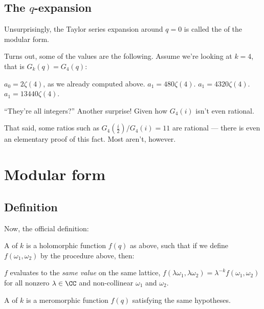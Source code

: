 \subsection{The $q$-expansion}

Unsurprisingly, the Taylor series expansion around $q=0$ is called the  of the
modular form.

Turns out, some of the values are the following. Assume we're looking at $k=4$, that is $G_k(q) =
G_4(q)$:
\begin{itemize}
	\ii $a_0 = 2 \zeta(4)$, as we already computed above.
	\ii $a_1 = 480 \zeta(4)$.
	\ii $a_1 = 4320 \zeta(4)$.
	\ii $a_1 = 13440 \zeta(4)$.
\end{itemize}

``They're all integers?'' Another surprise! Given how $G_4(i)$ isn't even rational.


\begin{remark}
	That said, some ratios such as $G_4(\frac{i}{2})/G_4(i)=11$ are rational ---
	there is even an elementary proof of this fact.
	Most aren't, however.
\end{remark}

\section{Modular form}

\subsection{Definition}

Now, the official definition:
\begin{definition}
	A  of  $k$ is a holomorphic function $f(q)$ as above,
	such that if we define $f(\omega_1, \omega_2)$ by the procedure above, then:
	\begin{itemize}
		\ii $f$ evaluates to the \emph{same value} on the same lattice,
		\ii $f(\lambda \omega_1, \lambda \omega_2) = \lambda^{-k} f(\omega_1, \omega_2)$
		for all nonzero $\lambda \in \CC$ and non-collinear $\omega_1$ and $\omega_2$.
	\end{itemize}

	A  of  $k$ is a meromorphic function $f(q)$ satisfying the
	same hypotheses.
\end{definition}

